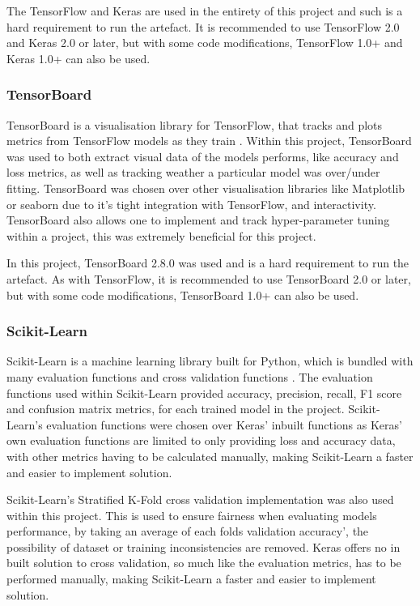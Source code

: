 The TensorFlow and Keras are used in the entirety of this project and such is a hard requirement to run the artefact. It is recommended to use TensorFlow 2.0 and Keras 2.0 or later, but with some code modifications, TensorFlow 1.0+ and Keras 1.0+ can also be used.

\subsubsection{TensorBoard}
TensorBoard is a visualisation library for TensorFlow, that tracks and plots metrics from TensorFlow models as they train \citep{TensorBo28:online}. Within this project, TensorBoard was used to both extract visual data of the models performs, like accuracy and loss metrics, as well as tracking weather a particular model was over/under fitting. TensorBoard was chosen over other visualisation libraries like Matplotlib or seaborn due to it's tight integration with TensorFlow, and interactivity. TensorBoard also allows one to implement and track hyper-parameter tuning within a project, this was extremely beneficial for this project.

In this project, TensorBoard 2.8.0 was used and is a hard requirement to run the artefact. As with TensorFlow, it is recommended to use TensorBoard 2.0 or later, but with some code modifications, TensorBoard 1.0+ can also be used.

\subsubsection{Scikit-Learn}
Scikit-Learn is a machine learning library built for Python, which is bundled with many evaluation functions \citep{33Metric9:online} and cross validation functions \citep{31Crossv34:online}. The evaluation functions used within Scikit-Learn provided accuracy, precision, recall, F1 score and confusion matrix metrics, for each trained model in the project. Scikit-Learn's evaluation functions were chosen over Keras' inbuilt functions as Keras' own evaluation functions are limited to only providing loss and accuracy data\citep{Modeltra48:online}, with other metrics having to be calculated manually, making Scikit-Learn a faster and easier to implement solution. 

Scikit-Learn's Stratified K-Fold \citep{sklearnm1:online} cross validation implementation was also used within this project. This is used to ensure fairness when evaluating models performance, by taking an average of each folds validation accuracy', the possibility of dataset or training inconsistencies are removed. Keras offers no in built solution to cross validation, so much like the evaluation metrics, has to be performed manually, making Scikit-Learn a faster and easier to implement solution.

